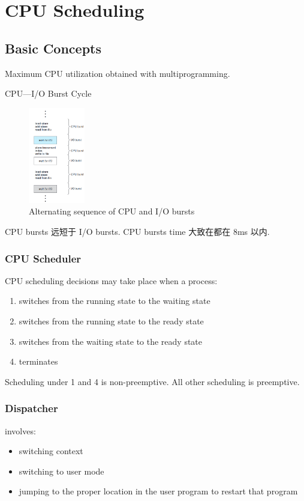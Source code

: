 \newpage
\section{CPU Scheduling}
\subsection{Basic Concepts}
Maximum CPU utilization obtained with multiprogramming. 

CPU---I/O Burst Cycle
\begin{figure}[!htb]
    \centering
    \includegraphics[width=0.22\textwidth]{pic/OS5/Alternating sequence of CPU and IO bursts}
    \caption{Alternating sequence of CPU and I/O bursts}
\end{figure}
CPU bursts 远短于 I/O bursts. CPU bursts time 大致在都在 8ms 以内.  

\subsubsection{CPU Scheduler}
CPU scheduling decisions may take place when a process:
\begin{enumerate}
    \item switches from the running state to the waiting state
    \item switches from the running state to the ready state 
    \item switches from the waiting state to the ready state
    \item terminates
\end{enumerate}
Scheduling under 1 and 4 is non-preemptive. All other scheduling is preemptive. 

\subsubsection{Dispatcher}
involves:
\begin{itemize}
    \item switching context
    \item switching to user mode
    \item jumping to the proper location in the user program to restart that program
\end{itemize}

